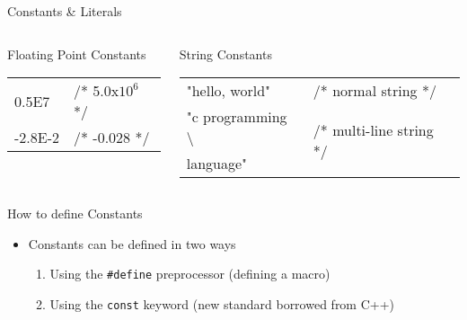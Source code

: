 \documentclass[10pt,t]{beamer}
\begin{document}
\begin{frame}{Constants \& Literals}
{\begin{columns}
\begin{block}{Floating Point Constants}
\begin{tabular}{ll}
          0.5E7     & /* 5.0x$10^6$*/\\
          -2.8E-2   & /* -0.028 */\\
        \end{tabular}
      \end{block}
        \begin{block}{String Constants}
          \begin{tabular}{ll}
            "hello, world"  & /* normal string */\\
            "c programming \textbackslash{} & \multirow{2}{*}{/* multi-line string */}\\
            language" & \\
          \end{tabular}
      \end{block}
    \end{columns}
  }
\end{frame}

\begin{frame}[fragile]{How to define Constants}
  \begin{itemize}
    \item Constants can be defined in two ways
    \begin{enumerate}
      \item Using the \lstinline{#define} preprocessor (defining a macro)
      \item Using the \lstinline{const} keyword (new standard borrowed from C++)
    \end{enumerate}
  \end{itemize}
  
\end{frame}
\end{document}
